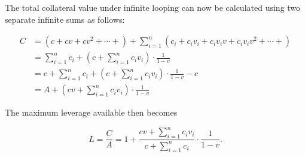 \documentclass[bibliography=numbered]{article}
\begin{document}
The total collateral value under infinite looping can now be calculated using two separate infinite sums as follows:

\begin{align}
    C
    &=
    \left( c
    +
    cv
    +
    cv^2
    +
    \cdots
    +
    \right)
    +
    \sum_{i=1}^{n}
    \left(
    c_i
    +
    c_i v_i
    +
    c_i v_i v
    +
    c_i v_i v^2
    +
    \cdots
    +
    \right) \\ \nonumber
    &=
    \sum_{i=1}^{n} c_i
    +
    \left( 
    c
    +
    \sum_{i=1}^{n} c_i v_i 
    \right)
    \cdot
    \frac{1}{1 - v} \\ \nonumber
    &=
    c
    +
    \sum_{i=1}^{n} c_i
    +
    \left( 
    c
    +
    \sum_{i=1}^{n} c_i v_i 
    \right)
    \cdot
    \frac{1}{1 - v}
    -
    c \\ \nonumber
    &=
    A
    +
    \left( 
    cv
    +
    \sum_{i=1}^{n} c_i v_i 
    \right)
    \cdot
    \frac{1}{1 - v}
\end{align}

The maximum leverage available then becomes

\begin{equation}
    L
    =
    \frac{C}{A}
    =
    1 + \frac{cv
    +
    \sum_{i=1}^{n} c_i v_i}{c + \sum_{i=1}^{n} c_i}
    \cdot
    \frac{1}{1 - v}.
\end{equation}
\end{document}
